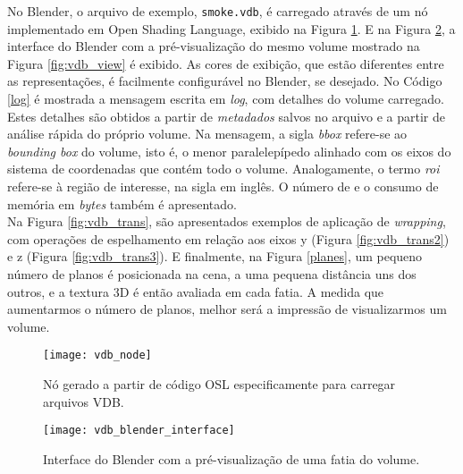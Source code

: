 No Blender, o arquivo de exemplo, \texttt{smoke.vdb}, é carregado através de um nó implementado em Open Shading Language, exibido na Figura \ref{vdb_node}. E na Figura \ref{vdb_blender_interface}, a interface do Blender com a pré-visualização do mesmo volume mostrado na Figura \ref{fig:vdb_view} é exibido. As cores de exibição, que estão diferentes entre as representações, é facilmente configurável no Blender, se desejado. No Código \ref{log} é mostrada a mensagem escrita em {\it log}, com detalhes do volume carregado. Estes detalhes são obtidos a partir de \emph{metadados} salvos no arquivo e a partir de análise rápida do próprio volume. Na mensagem, a sigla \emph{bbox} refere-se ao \emph{bounding box} do volume, isto é, o menor paralelepípedo alinhado com os eixos do sistema de coordenadas que contém todo o volume. Analogamente, o termo \emph{roi} refere-se à região de interesse, na sigla em inglês. O número de \voxels e o consumo de memória em {\it bytes} também é apresentado. \\

Na Figura \ref{fig:vdb_trans}, são apresentados exemplos de aplicação de \emph{wrapping}, com operações de espelhamento em relação aos eixos y (Figura \ref{fig:vdb_trans2}) e z (Figura \ref{fig:vdb_trans3}). E finalmente, na Figura \ref{planes}, um pequeno número de planos é posicionada na cena, a uma pequena distância uns dos outros, e a textura 3D é então avaliada em cada fatia. A medida que aumentarmos o número de planos, melhor será a impressão de visualizarmos um volume.



\begin{figure}[!htb]
\center
\texttt{[image: vdb\_node]}
\caption{Nó gerado a partir de código OSL especificamente para carregar arquivos VDB.}
\label{vdb_node}
\end{figure}

\begin{figure}[!htb]
\center
\texttt{[image: vdb\_blender\_interface]}
\caption{Interface do Blender com a pré-visualização de uma fatia do volume.}
\label{vdb_blender_interface}
\end{figure}

